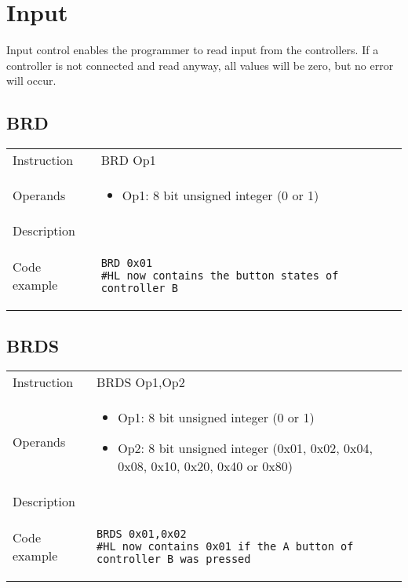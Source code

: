 \newpage

\section{Input}
Input control enables the programmer to read input from the controllers. If a controller is not connected and read anyway, all values will be zero, but no error will occur.

\subsection{BRD}
\renewcommand*{\arraystretch}{2.0}
\begin{longtable}{P{3cm}P{9cm}}
\midrule
\noindent Instruction & BRD Op1 \\
\noindent Operands &
\begin{itemize}[label={},noitemsep,leftmargin=*,topsep=0pt,partopsep=0pt, itemsep=1em]
\item Op1: 8 bit unsigned integer (0 or 1)
\end{itemize}\\
\noindent Description &  \\
\noindent Code example & 
\begin{lstlisting}
BRD 0x01
#HL now contains the button states of controller B
\end{lstlisting} \\
\end{longtable}


\subsection{BRDS}
\renewcommand*{\arraystretch}{2.0}
\begin{longtable}{P{3cm}P{9cm}}
\midrule
\noindent Instruction & BRDS Op1,Op2 \\
\noindent Operands &
\begin{itemize}[label={},noitemsep,leftmargin=*,topsep=0pt,partopsep=0pt, itemsep=1em]
\item Op1: 8 bit unsigned integer (0 or 1)
\item Op2: 8 bit unsigned integer (0x01, 0x02, 0x04, 0x08, 0x10, 0x20, 0x40 or 0x80)
\end{itemize}\\
\noindent Description &  \\
\noindent Code example & 
\begin{lstlisting}
BRDS 0x01,0x02
#HL now contains 0x01 if the A button of controller B was pressed
\end{lstlisting} \\
\end{longtable}


